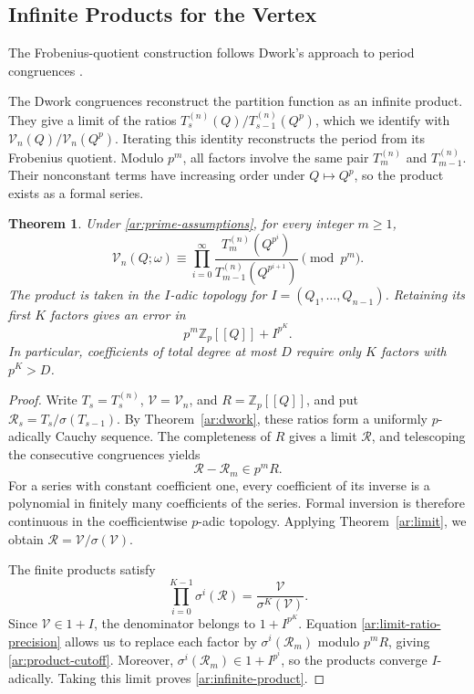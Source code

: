 \documentclass[11pt]{amsart}
\newtheorem{theorem}{Theorem}[section]
\theoremstyle{definition}
\theoremstyle{remark}
\numberwithin{equation}{section}
\newcommand{\Z}{\mathbb Z}
\begin{document}
\subsection{Infinite Products for the Vertex}
The Frobenius-quotient construction follows Dwork's approach to
period congruences \cite{D69}.
\label{ar:section-product}

The Dwork congruences reconstruct the partition function as an
infinite product. They give a limit of the ratios
$T_s^{(n)}(Q)/T_{s-1}^{(n)}(Q^p)$, which we identify with
$\mathcal V_n(Q)/\mathcal V_n(Q^p)$. Iterating this identity
reconstructs the period from its Frobenius quotient. Modulo
$p^m$, all factors involve the same pair $T_m^{(n)}$ and
$T_{m-1}^{(n)}$. Their nonconstant terms have increasing order
under $Q\mapsto Q^p$, so the product exists as a formal series.

\begin{theorem}\label{ar:product}
Under \eqref{ar:prime-assumptions}, for every integer $m\geq1$,
\begin{equation}\label{ar:infinite-product}
 \mathcal V_n(Q;\omega)\equiv
 \prod_{i=0}^{\infty}
 \frac{T_m^{(n)}(Q^{p^i})}
      {T_{m-1}^{(n)}(Q^{p^{i+1}})}
 \pmod{p^m}.
\end{equation}
The product is taken in the $I$-adic topology for
$I=(Q_1,\ldots,Q_{n-1})$. Retaining its first $K$ factors gives
an error in
\begin{equation}\label{ar:product-cutoff}
 p^m\Z_p[[Q]]+I^{p^K}.
\end{equation}
In particular, coefficients of total degree at most $D$ require
only $K$ factors with $p^K>D$.
\end{theorem}

\begin{proof}
Write $T_s=T_s^{(n)}$, $\mathcal V=\mathcal V_n$, and
$R=\Z_p[[Q]]$, and put
$\mathcal R_s=T_s/\sigma(T_{s-1})$. By
Theorem~\ref{ar:dwork}, these ratios form a uniformly $p$-adically
Cauchy sequence. The completeness of $R$ gives a limit
$\mathcal R$, and telescoping the consecutive congruences yields
\begin{equation}\label{ar:limit-ratio-precision}
 \mathcal R-\mathcal R_m\in p^mR.
\end{equation}
For a series with constant coefficient one, every coefficient of
its inverse is a polynomial in finitely many coefficients of the
series. Formal inversion is therefore continuous in the
coefficientwise $p$-adic topology. Applying
Theorem~\ref{ar:limit}, we obtain
$\mathcal R=\mathcal V/\sigma(\mathcal V)$.

The finite products satisfy
\[
 \prod_{i=0}^{K-1}\sigma^i(\mathcal R)
 =\frac{\mathcal V}{\sigma^K(\mathcal V)}.
\]
Since $\mathcal V\in1+I$, the denominator belongs to
$1+I^{p^K}$. Equation \eqref{ar:limit-ratio-precision} allows
us to replace each factor by $\sigma^i(\mathcal R_m)$ modulo
$p^mR$, giving \eqref{ar:product-cutoff}. Moreover,
$\sigma^i(\mathcal R_m)\in1+I^{p^i}$, so the products converge
$I$-adically. Taking this limit proves
\eqref{ar:infinite-product}.
\end{proof}
\end{document}
